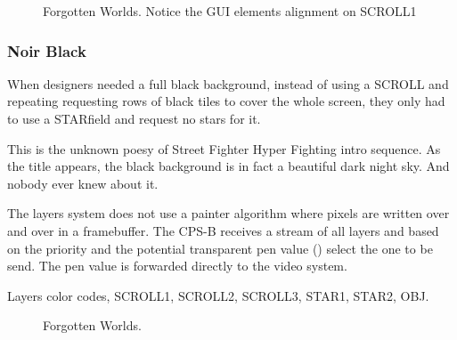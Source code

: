 




\vfill
\begin{figure}[!b]
 \caption*{Forgotten Worlds. Notice the GUI elements alignment on SCROLL1}%
 \end{figure}%
\pagebreak

\subsubsection{Noir Black}




When designers needed a full black background, instead of using a SCROLL and repeating requesting rows of black tiles to cover the whole screen, they only had to use a STARfield and request no stars for it. 

This is the unknown poesy of Street Fighter Hyper Fighting intro sequence. As the title appears, the black background is in fact a beautiful dark night sky. And nobody ever knew about it.

\begin{trivia}
The layers system does not use a painter algorithm where pixels are written over and over in a framebuffer. The CPS-B receives a stream of all layers and based on the priority and the potential transparent pen value () select the one to be send. The pen value is forwarded directly to the video system.
\end{trivia}


Layers color codes,  SCROLL1,  SCROLL2,  SCROLL3,  STAR1,  STAR2,  OBJ.

\vfill
\begin{figure}[!b]
 \caption*{Forgotten Worlds.}%
 \end{figure}%
\pagebreak









